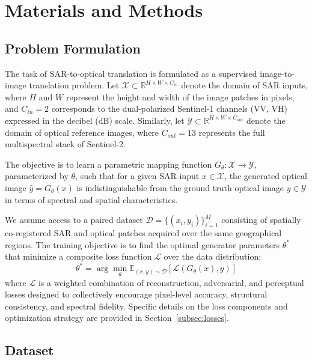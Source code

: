 \section{Materials and Methods}
\subsection{Problem Formulation}
The task of SAR-to-optical translation is formulated as a supervised image-to-image translation problem. Let $\mathcal{X} \subset \mathbb{R}^{H \times W \times C_{in}}$ denote the domain of SAR inputs, where $H$ and $W$ represent the height and width of the image patches in pixels, and $C_{in}=2$ corresponds to the dual-polarized Sentinel-1 channels (VV, VH) expressed in the decibel (dB) scale. Similarly, let $\mathcal{Y} \subset \mathbb{R}^{H \times W \times C_{out}}$ denote the domain of optical reference images, where $C_{out}=13$ represents the full multispectral stack of Sentinel-2. 

The objective is to learn a parametric mapping function $G_{\theta}: \mathcal{X} \rightarrow \mathcal{Y}$, parameterized by $\theta$, such that for a given SAR input $x \in \mathcal{X}$, the generated optical image $\hat{y} = G_{\theta}(x)$ is indistinguishable from the ground truth optical image $y \in \mathcal{Y}$ in terms of spectral and spatial characteristics.

We assume access to a paired dataset $\mathcal{D} = \{(x_i, y_i)\}_{i=1}^{M}$ consisting of spatially co-registered SAR and optical patches acquired over the same geographical regions. The training objective is to find the optimal generator parameters $\theta^*$ that minimize a composite loss function $\mathcal{L}$ over the data distribution:
\begin{equation}
    \theta^* = \arg\min_{\theta} \mathbb{E}_{(x,y) \sim \mathcal{D}} [\mathcal{L}(G_{\theta}(x), y)]
\end{equation}
where $\mathcal{L}$ is a weighted combination of reconstruction, adversarial, and perceptual losses designed to collectively encourage pixel-level accuracy, structural consistency, and spectral fidelity. Specific details on the loss components and optimization strategy are provided in Section~\ref{subsec:losses}.

\subsection{Dataset}
\label{sec:datasets}

